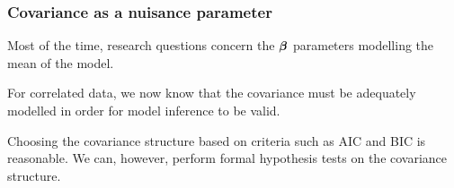 \documentclass{beamer}
\begin{document}
\begin{frame}[fragile]
\frametitle{Covariance as a nuisance parameter}
\bi
\item Most of the time, research questions concern the $\boldsymbol {\beta}$ parameters modelling the mean of the model. 
\item For correlated data, we now know that the covariance must be adequately modelled in order for model inference to be valid. 
\item Choosing the covariance structure based on criteria such as AIC and BIC is reasonable. We can, however, perform formal hypothesis tests on the covariance structure.
\ei
\end{frame}
% 
\end{document}
